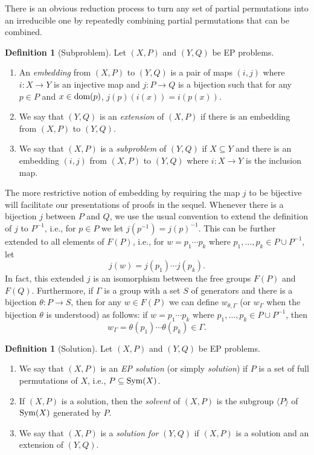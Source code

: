\documentclass[10pt,a4paper]{amsart}
\theoremstyle{definition}
\newtheorem{definition}[theorem]{Definition}
\newcommand{\dom}{{\mbox{\rm dom}}}
\theoremstyle{definition}
\numberwithin{equation}{section}
\begin{document}
There is an obvious reduction process to turn any set of partial permutations into an irreducible one by repeatedly combining partial permutations that can be combined. 

\begin{definition}[Subproblem]\label{def:subproblem} Let $(X, P)$ and $(Y, Q)$ be EP problems.
\begin{enumerate}
\item[(1)] An {\em embedding} from $(X, P)$ to $(Y, Q)$ is a pair of maps $(i, j)$ where $i\colon X\to Y$ is an injective map and $j\colon P\to Q$ is a bijection such that for any $p\in P$ and $x\in \dom(p)$, $j(p)(i(x))=i(p(x))$.
\item[(2)] We say that $(Y, Q)$ is an {\em extension} of $(X, P)$ if there is an embedding from $(X, P)$ to $(Y, Q)$.
\item[(3)] We say that $(X, P)$ is a {\em subproblem} of $(Y, Q)$ if $X\subseteq Y$ and there is an embedding $(i,j)$ from $(X, P)$ to $(Y, Q)$ where $i\colon X\to Y$ is the inclusion map.
\end{enumerate}
\end{definition}

The more restrictive notion of embedding by requiring the map $j$ to be bijective will facilitate our presentations of proofs in the sequel. Whenever there is a bijection $j$ between $P$ and $Q$, we use the usual convention to extend the definition of $j$ to $P^{-1}$, i.e., for $p\in P$ we let $j(p^{-1})=j(p)^{-1}$. This can be further extended to all elements of $F(P)$, i.e., for $w=p_1\cdots p_k$ where $p_1, \dots, p_k\in P\cup P^{-1}$, let 
$$ j(w)=j(p_1)\cdots j(p_k). $$ In fact, this extended $j$ is an isomorphism between the free groups $F(P)$ and $F(Q)$. Furthermore, if $\Gamma$ is a group with a set $S$ of generators and there is a bijection $\theta\colon P\to S$, then for any $w\in F(P)$ we can define $w_{\theta, \Gamma}$ (or $w_\Gamma$ when the bijection $\theta$ is understood) as follows: if $w=p_1\cdots p_k$ where $p_1,\dots, p_k\in P\cup P^{-1}$, then
$$ w_\Gamma=\theta(p_1)\cdots \theta(p_k)\in \Gamma. $$

\begin{definition}[Solution]\label{def:solution} Let $(X, P)$ and $(Y, Q)$ be EP problems.
\begin{enumerate}
\item[(1)] We say that $(X, P)$ is an {\em EP solution} (or simply {\em solution}) if $P$ is a set of full permutations of $X$, i.e., $P\subseteq \mbox{\rm Sym}(X)$. 
\item[(2)] If $(X, P)$ is a solution, then the {\em solvent} of $(X, P)$ is the subgroup $\langle P\rangle$ of $\mbox{\rm Sym}(X)$ generated by $P$.
\item[(3)] We say that $(X, P)$ is a {\em solution for} $(Y, Q)$ if $(X, P)$ is a solution and an extension of $(Y, Q)$.
\end{enumerate}
\end{definition}
\end{document}
